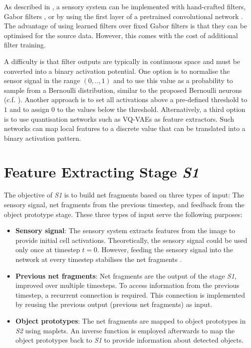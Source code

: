 As described in , a sensory system can be implemented with hand-crafted filters, Gabor filters \cite{gabor_theory_1946, granlund_search_1978}, or by using the first layer of a pretrained convolutional network . The advantage of using learned filters over fixed Gabor filters is that they can be optimised for the source data. However, this comes with the cost of additional filter training.

A difficulty is that filter outputs are typically in continuous space and must be converted into a binary activation potential.
One option is to normalise the sensor signal in the range $(0, .., 1)$ and to use this value as a probability to sample from a Bernoulli distribution, similar to the proposed Bernoulli neurons (c.f. ).
Another approach is to set all activations above a pre-defined threshold to $1$ and to assign 0 to the values below the threshold.
Alternatively, a third option is to use quantisation networks such as VQ-VAEs  as feature extractors. Such networks can map local features to a discrete value that can be translated into a binary activation pattern.


\section{Feature Extracting Stage \emph{S1}}
The objective of \emph{S1} is to build net fragments based on three types of input: The sensory signal, net fragments from the previous timestep, and feedback from the object prototype stage.
These three types of input serve the following purposes:
\begin{itemize}
    \item \textbf{Sensory signal}: The sensory system extracts features from the image to provide initial cell activations. Theoretically, the sensory signal could be used only once at timestep $t=0$. However, feeding the sensory signal into the network at every timestep stabilises the net fragments .
    \item \textbf{Previous net fragments}: Net fragments are the output of the stage \emph{S1}, improved over multiple timesteps.
    To access information from the previous timestep, a recurrent connection is required. This connection is implemented by reusing the previous output (previous net fragments) as input.
    \item \textbf{Object prototypes}: The net fragments are mapped to object prototypes in \emph{S2} using maplets. An inverse function is employed afterwards to map the object prototypes back to \emph{S1} to provide information about detected objects.
\end{itemize}

